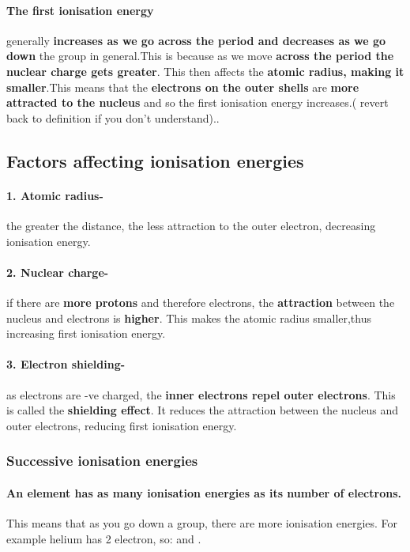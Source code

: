 	\paragraph{The first ionisation energy} generally \textbf{increases as we go across the period and decreases as we go down} the group in general.This is because as we move \textbf{across the period the nuclear charge gets greater}.
This then affects the \textbf{atomic radius, making it smaller}.This means that the \textbf{electrons on the outer shells} are \textbf{more attracted to the nucleus} and so the first ionisation energy increases.( revert back to definition if you don't understand)..

\subsection*{Factors affecting ionisation energies}
\paragraph{1. Atomic radius-}the greater the distance, the less attraction to the outer electron, decreasing ionisation energy.
\paragraph{2. Nuclear charge-}if there are \textbf{more protons} and therefore electrons, the \textbf{attraction} between the nucleus and electrons is \textbf{higher}. This makes the atomic radius smaller,thus increasing first ionisation energy.
\paragraph{3. Electron shielding-}as electrons are -ve charged, the \textbf{inner electrons repel outer electrons}. This is called the \textbf{shielding effect}. It reduces the attraction between the nucleus and outer electrons, reducing first ionisation energy.
\subsubsection*{Successive ionisation energies}	
\paragraph{An element has as many ionisation energies as its number of electrons.}This means that as you go down a group, there are more ionisation energies. For example helium has 2 electron, so:
  and
 .
